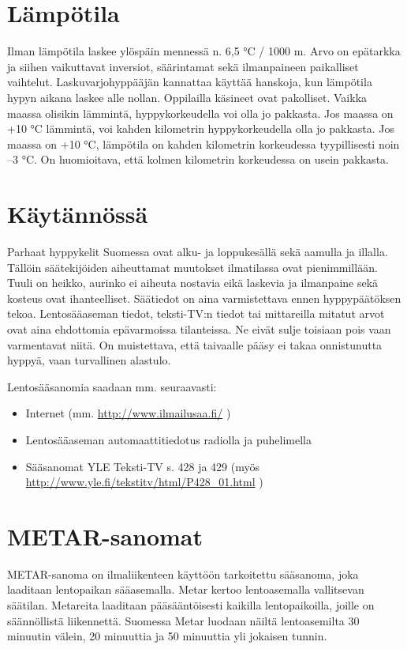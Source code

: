 \section{Lämpötila}
\label{saaoppi-lampotila}


Ilman lämpötila laskee ylöspäin mennessä n. 6,5 °C / 1000 m. Arvo on epätarkka ja siihen vaikuttavat inversiot, säärintamat sekä ilmanpaineen paikalliset vaihtelut. Laskuvarjohyppääjän kannattaa käyttää hanskoja, kun lämpötila hypyn aikana laskee alle nollan. Oppilailla käsineet ovat pakolliset. Vaikka maassa olisikin lämmintä, hyppykorkeudella voi olla jo pakkasta. Jos maassa on +10 °C lämmintä, voi kahden kilometrin hyppykorkeudella olla jo pakkasta. Jos maassa on +10 °C, lämpötila on kahden kilometrin korkeudessa tyypillisesti noin –3 °C. On huomioitava, että kolmen kilometrin korkeudessa on usein pakkasta. 

\section{Käytännössä}
\label{saaoppi-kaytannossa}


Parhaat hyppykelit Suomessa ovat alku- ja loppukesällä sekä aamulla ja illalla. Tällöin säätekijöiden aiheuttamat muutokset ilmatilassa ovat pienimmillään. Tuuli on heikko, aurinko ei aiheuta nostavia eikä laskevia ja ilmanpaine sekä kosteus ovat ihanteelliset. Säätiedot on aina varmistettava ennen hyppypäätöksen tekoa. Lentosääaseman tiedot, teksti-TV:n tiedot tai mittareilla mitatut arvot ovat aina ehdottomia epävarmoissa tilanteissa. Ne eivät sulje toisiaan pois vaan varmentavat niitä. On muistettava, että taivaalle pääsy ei takaa onnistunutta hyppyä, vaan turvallinen alastulo. 


Lentosääsanomia saadaan mm. seuraavasti: 

\begin{itemize}
\item  Internet (mm. \url{http://www.ilmailusaa.fi/} ) 
\item  Lentosääaseman automaattitiedotus radiolla ja puhelimella 
\item  Sääsanomat YLE Teksti-TV s. 428 ja 429 (myös \url{http://www.yle.fi/tekstitv/html/P428_01.html} ) 
\end{itemize}
\section{ METAR-sanomat }
\label{saaoppi-metar-sanomat}


METAR-sanoma on ilmaliikenteen käyttöön tarkoitettu sääsanoma, joka laaditaan lentopaikan sääasemalla. Metar kertoo lentoasemalla vallitsevan säätilan. Metareita laaditaan pääsääntöisesti kaikilla lentopaikoilla, joille on säännöllistä liikennettä. Suomessa Metar luodaan näiltä lentoasemilta 30 minuutin välein, 20 minuuttia ja 50 minuuttia yli jokaisen tunnin. 



